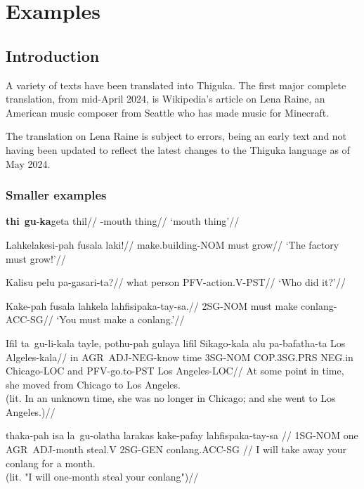 
\part{Examples}
\chapter{Introduction}
A variety of texts have been translated into Thiguka. The first major complete translation, from mid-April 2024, is Wikipedia's article on Lena Raine, an American music composer from Seattle who has made music for Minecraft.

The translation on Lena Raine is subject to errors, being an early text and not having been updated to reflect the latest changes to the Thiguka language as of May 2024.

\section{Smaller examples}
\ex
\begingl
    \gla \textbf{thi}~\textbf{gu}-\textbf{ka}geta thil//
    \glb \agradj{}-mouth thing//
    \glft `mouth thing'//
\endgl
\xe

\ex
\begingl
    \gla Lahkelakesi-pah fusala laki!//
    \glb make.building-NOM must grow//
    \glft `The factory must grow!'//
\endgl
\xe

\ex
\begingl
    \gla Kalisu pelu pa-gasari-ta?//
    \glb what person PFV-action.V-PST//
    \glft `Who did it?'//
\endgl
\xe

\ex
\begingl
    \gla Kake-pah fusala lahkela lahfisipaka-tay-sa.//
    \glb 2SG-NOM must make conlang-ACC-SG//
    \glft `You must make a conlang.'//
\endgl
\xe

\ex
\begingl
    \gla Ifil ta~gu-li-kala    tayle, pothu-pah gulaya      lifil  Sikago-kala alu pa-bafatha-ta Los Algeles-kala//
    \glb in   AGR~ADJ-NEG-know time   3SG-NOM   COP.3SG.PRS NEG.in Chicago-LOC and PFV-go.to-PST Los Angeles-LOC//
    \glft At some point in time, she moved from Chicago to Los Angeles.\\
          (lit. In an unknown time, she was no longer in Chicago; and she went to Los Angeles.)//
\endgl
\xe

\ex
\begingl
    \gla  thaka-pah isa la~gu-olatha  larakas kake-pafay lahfispaka-tay-sa //
    \glb  1SG-NOM   one AGR~ADJ-month steal.V 2SG-GEN    conlang.ACC-SG //
    \glft I will take away your conlang for a month.\\
          (lit. "I will one-month steal your conlang")//
\endgl
\xe

